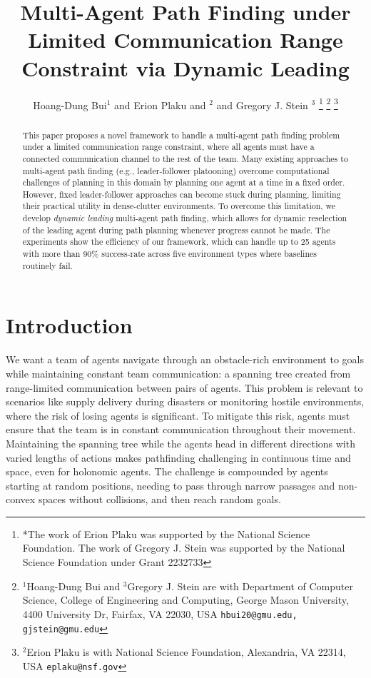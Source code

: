 \documentclass[letterpaper, 10 pt, conference]{ieeeconf}  %
\title{\LARGE \bf
Multi-Agent Path Finding under Limited Communication Range Constraint via Dynamic Leading
}
\author{Hoang-Dung Bui$^{1}$ and Erion Plaku and $^{2}$ and Gregory J. Stein $^{3}$%
\thanks{*The work of Erion Plaku was supported by the National Science Foundation. The work of Gregory J. Stein was supported by the National
Science Foundation under Grant 2232733}%
\thanks{$^{1}$Hoang-Dung Bui and $^{3}$Gregory J. Stein are with Department of Computer Science, College of Engineering and Computing,
        George Mason University, 4400 University Dr, Fairfax, VA 22030, USA
        {\tt\small hbui20@gmu.edu, gjstein@gmu.edu}}%
\thanks{$^{2}$Erion Plaku is with National Science Foundation, Alexandria, VA 22314, USA
        {\tt\small eplaku@nsf.gov}}%
}
\begin{document}
\maketitle
\thispagestyle{empty}
\pagestyle{empty}


\begin{abstract}

This paper proposes a novel framework to handle a multi-agent path finding problem under a limited communication range constraint, where all agents must have a connected communication channel to the rest of the team.
Many existing approaches to multi-agent path finding (e.g., leader-follower platooning) overcome computational challenges of planning in this domain by planning one agent at a time in a fixed order. 
However, fixed leader-follower approaches can become stuck during planning, limiting their practical utility in dense-clutter environments.
To overcome this limitation, we develop \textit{dynamic leading} multi-agent path finding, which allows for dynamic reselection of the leading agent during path planning whenever progress cannot be made.
The experiments show the efficiency of our framework, which can handle up to 25 agents with more than 90\% success-rate across five environment types where baselines routinely fail. 

\end{abstract}



\section{Introduction} \label{sec:Intro}
We want a team of agents navigate through an obstacle-rich environment to goals while maintaining constant 
team communication: a spanning tree created from range-limited communication between pairs of agents.
This problem is relevant to scenarios like supply delivery during disasters or monitoring hostile environments, 
where the risk of losing agents is significant. To mitigate this risk, agents must ensure that the team is 
in constant communication throughout their movement. Maintaining the spanning tree while the agents head in 
different directions with varied lengths of actions makes pathfinding challenging in continuous time and space, even for holonomic agents. 
The challenge is compounded by agents starting at random positions, needing to pass through narrow passages 
and non-convex spaces without collisions, and then reach random goals.
\end{document}
